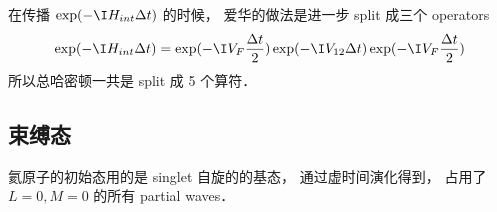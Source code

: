 在传播 $\exp(-\I H_{int}\Delta t)$ 的时候， 爱华的做法是进一步 split 成三个 operators
\begin{equation}
\exp(-\I H_{int}\Delta t) = \exp(-\I V_F\frac{\Delta t}{2})   \exp(-\I V_{12} \Delta t) \exp(-\I V_F\frac{\Delta t}{2})
\end{equation}
所以总哈密顿一共是 split 成 5 个算符．

\subsection{束缚态}
氦原子的初始态用的是 singlet 自旋的的基态， 通过虚时间演化得到， 占用了 $L = 0, M = 0$ 的所有 partial waves．
